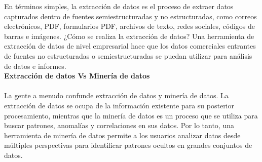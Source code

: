 \documentclass[twoside,twocolumn]{article}
\begin{document}
En términos simples, la extracción de datos es el proceso de extraer datos capturados dentro de fuentes semiestructuradas y no estructuradas, como correos electrónicos, PDF, formularios PDF, archivos de texto, redes sociales, códigos de barras e imágenes. ¿Cómo se realiza la extracción de datos? Una herramienta de extracción de datos de nivel empresarial hace que los datos comerciales entrantes de fuentes no estructuradas o semiestructuradas se puedan utilizar para análisis de datos e informes.\\

\textbf{Extracción de datos Vs Minería de datos}\\
\\La gente a menudo confunde extracción de datos y minería de datos. La extracción de datos se ocupa de la información existente para su posterior procesamiento, mientras que la minería de datos es un proceso que se utiliza para buscar patrones, anomalías y correlaciones en sus datos. Por lo tanto, una herramienta de minería de datos permite a los usuarios analizar datos desde múltiples perspectivas para identificar patrones ocultos en grandes conjuntos de datos.
\\
\end{document}
